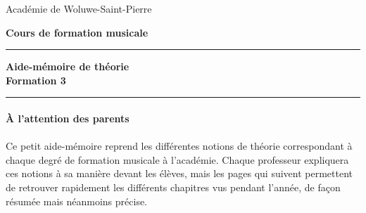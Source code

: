 \documentclass[11pt,a4paper]{scrreprt}
\begin{document}
\thispagestyle{empty}
\begin{center}
\begin{LARGE}
Académie de Woluwe-Saint-Pierre
\end{LARGE}
\end{center}

\begin{center}
\begin{LARGE}
\textbf{Cours de formation musicale}
\end{LARGE}
\end{center}

\begin{center}
\vspace{5cm}
\noindent\rule{\textwidth}{0.5mm}
\begin{huge}
\textbf{Aide-mémoire de théorie \\
\vspace{2 cm}
 Formation 3}
\end{huge}
\noindent\rule{\textwidth}{0.5mm}
\end{center}

\clearpage
\thispagestyle{empty}
\begin{vcenterpage}


\paragraph{À l'attention des parents}
\paragraph{}
Ce petit aide-mémoire reprend les différentes notions de théorie correspondant à chaque degré de formation musicale à l'académie. Chaque professeur expliquera ces notions à sa manière devant les élèves, mais les pages qui suivent permettent de retrouver rapidement les différents chapitres vus pendant l'année, de façon résumée mais néanmoins précise.


\end{vcenterpage}
\newpage
{}
\fancyfoot[CO]{\thepage}%
\renewcommand{\contentsname}{Sommaire}
\tableofcontents
\cleardoublepage
\clearpage
{}
\fancyfoot[CO]{\thepage}%
\end{document}
